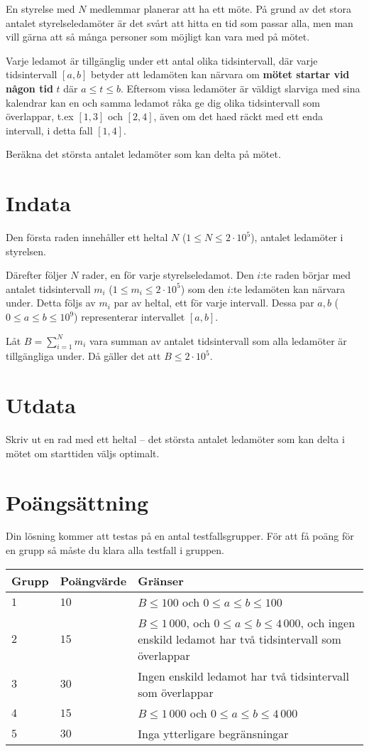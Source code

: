 En styrelse med $N$ medlemmar planerar att ha ett möte.
På grund av det stora antalet styrelseledamöter är det svårt att hitta en tid som passar alla, men man vill gärna att så många personer som möjligt kan vara med på mötet.

Varje ledamot är tillgänglig under ett antal olika tidsintervall, där varje tidsintervall $[a, b]$ betyder att ledamöten kan närvara om \textbf{mötet startar vid någon tid} $t$ där $a \le t \le b$.
Eftersom vissa ledamöter är väldigt slarviga med sina kalendrar kan en och samma ledamot råka ge dig olika tidsintervall som överlappar, t.ex $[1, 3]$ och $[2, 4]$, även om det haed räckt med ett enda intervall, i detta fall $[1, 4]$.

Beräkna det största antalet ledamöter som kan delta på mötet.

\section*{Indata}
Den första raden innehåller ett heltal $N$ ($1 \le N \leq 2\cdot 10^5$), antalet ledamöter i styrelsen.

Därefter följer $N$ rader, en för varje styrelseledamot.
Den $i$:te raden börjar med antalet tidsintervall $m_i$ ($1 \leq m_i \leq 2\cdot 10^5$) som den $i$:te ledamöten kan närvara under.
Detta följs av $m_i$ par av heltal, ett för varje intervall.
Dessa par $a, b$ ($0 \le a \le b \le 10^9$) representerar intervallet $[a, b]$.

Låt $B=\sum_{i=1}^{N} m_i$ vara summan av antalet tidsintervall som alla ledamöter är tillgängliga under.
Då gäller det att $B \leq 2\cdot 10^5$.

\section*{Utdata}
Skriv ut en rad med ett heltal -- det största antalet ledamöter som kan delta i mötet om starttiden väljs optimalt.

\section*{Poängsättning}
Din lösning kommer att testas på en antal testfallsgrupper.
För att få poäng för en grupp så måste du klara alla testfall i gruppen.

\noindent
\begin{tabular}{| l | l | p{12cm} |}
  \hline
  Grupp & Poängvärde & Gränser \\ \hline
  $1$   & $10$       & $B \leq 100$ och $0 \leq a \leq b \leq 100$ \\ \hline
  $2$   & $15$       & $B \leq  1\,000$, och $0 \leq a \leq b \leq 4\,000$, och ingen enskild ledamot har två tidsintervall som överlappar \\ \hline
  $3$   & $30$       & Ingen enskild ledamot har två tidsintervall som överlappar \\ \hline
  $4$   & $15$       & $B \leq 1\,000$ och $0 \leq a \leq b \leq 4\,000$ \\ \hline
  $5$   & $30$       & Inga ytterligare begränsningar \\ \hline
\end{tabular}

